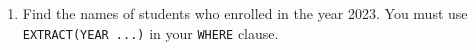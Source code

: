 \documentclass[12pt,a4paper]{article}
\begin{document}
\begin{enumerate}



\item Find the names of students who enrolled in the year 2023. You must use \texttt{EXTRACT(YEAR ...)} in your \texttt{WHERE} clause.





\end{enumerate}
\end{document}
